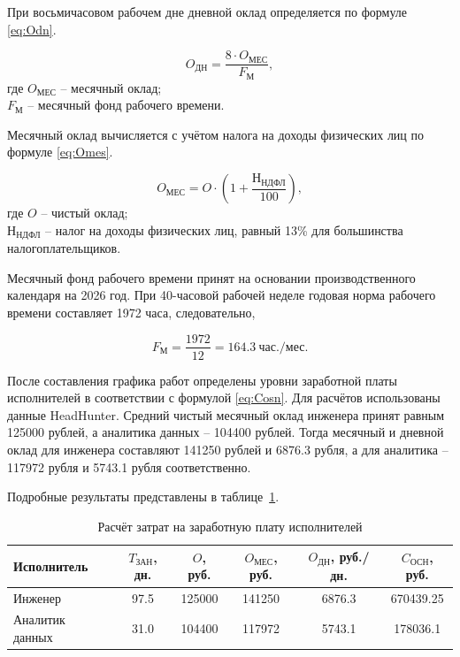 При восьмичасовом рабочем дне дневной оклад определяется по формуле \eqref{eq:Odn}.

\nopagebreak
\begin{equation}\label{eq:Odn}
O_{\text{ДН}} = \frac{8 \cdot O_{\text{МЕС}}}{F_{\text{М}}},
\end{equation}
где $O_{\text{МЕС}}$ -- месячный оклад; \\ $F_{\text{М}}$ -- месячный фонд рабочего времени.

Месячный оклад вычисляется с учётом налога на доходы физических лиц по формуле \eqref{eq:Omes}.

\begin{equation}\label{eq:Omes}
O_{\text{МЕС}} = O \cdot \left(1 + \frac{\text{Н}_{\text{НДФЛ}}}{100}\right),
\end{equation}
где $O$ -- чистый оклад; \\ $\text{Н}_{\text{НДФЛ}}$ -- налог на доходы физических лиц, равный 13\% для большинства налогоплательщиков.

Месячный фонд рабочего времени принят на основании производственного календаря на 2026 год. При 40-часовой рабочей неделе годовая норма рабочего времени составляет 1972 часа, следовательно,

$$
F_{\text{М}} = \frac{1972}{12} = 164.3 \ \text{час./мес.}
$$

После составления графика работ определены уровни заработной платы исполнителей в соответствии с формулой \eqref{eq:Cosn}. Для расчётов использованы данные HeadHunter. Средний чистый месячный оклад инженера принят равным 125000 рублей, а аналитика данных -- 104400 рублей. Тогда месячный и дневной оклад для инженера составляют 141250 рублей и 6876.3 рубля, а для аналитика -- 117972 рубля и 5743.1 рубля соответственно.

Подробные результаты представлены в таблице~\ref{tab:salary_calc}.

\begin{table}[h!]
    \centering
    \caption{Расчёт затрат на заработную плату исполнителей}
    \label{tab:salary_calc}
    \begin{tabular}{|p{3.2cm}|c|c|c|c|c|}
        \hline
        Исполнитель & $T_{\text{ЗАН}}$, дн. & $O$, руб. & $O_{\text{МЕС}}$, руб. & $O_{\text{ДН}}$, руб./дн. & $C_{\text{ОСН}}$, руб. \\
        \hline
        Инженер & 97.5 & 125000 & 141250 & 6876.3 & 670439.25 \\
        \hline
        Аналитик данных & 31.0 & 104400 & 117972 & 5743.1 & 178036.1 \\
        \hline
    \end{tabular}
\end{table}

